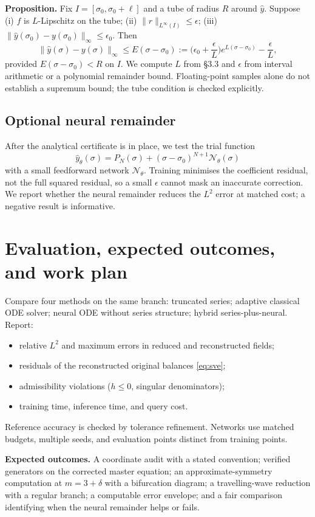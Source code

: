 \documentclass[12pt,a4paper]{article}
\begin{document}
\textbf{Proposition.} Fix $I=[\sigma_0,\sigma_0+\ell]$ and a tube of radius $R$ around $\hat y$. Suppose (i) $f$ is $L$-Lipschitz on the tube; (ii) $\|r\|_{L^\infty(I)}\le\epsilon$; (iii) $\|\hat y(\sigma_0)-y(\sigma_0)\|_\infty\le\epsilon_0$. Then
\[
\|\hat y(\sigma)-y(\sigma)\|_\infty\le E(\sigma-\sigma_0)
:=\Big(\epsilon_0+\frac{\epsilon}{L}\Big)e^{L(\sigma-\sigma_0)}-\frac{\epsilon}{L},
\]
provided $E(\sigma-\sigma_0)<R$ on $I$. We compute $L$ from \S3.3 and $\epsilon$ from interval arithmetic or a polynomial remainder bound. Floating-point samples alone do not establish a supremum bound; the tube condition is checked explicitly.

\subsection*{Optional neural remainder}
After the analytical certificate is in place, we test the trial function
\[
\hat y_\theta(\sigma)=P_N(\sigma)+(\sigma-\sigma_0)^{N+1}\mathcal N_\theta(\sigma)
\]
with a small feedforward network $\mathcal N_\theta$. Training minimises the coefficient residual, not the full squared residual, so a small $\epsilon$ cannot mask an inaccurate correction. We report whether the neural remainder reduces the $L^2$ error at matched cost; a negative result is informative.

\section{Evaluation, expected outcomes, and work plan}
Compare four methods on the same branch: truncated series; adaptive classical ODE solver; neural ODE without series structure; hybrid series-plus-neural. Report:
\begin{itemize}
\item relative $L^2$ and maximum errors in reduced and reconstructed fields;
\item residuals of the reconstructed original balances \eqref{eq:sve};
\item admissibility violations ($h\le 0$, singular denominators);
\item training time, inference time, and query cost.
\end{itemize}
Reference accuracy is checked by tolerance refinement. Networks use matched budgets, multiple seeds, and evaluation points distinct from training points.

\textbf{Expected outcomes.} A coordinate audit with a stated convention; verified generators on the corrected master equation; an approximate-symmetry computation at $m=3+\delta$ with a bifurcation diagram; a travelling-wave reduction with a regular branch; a computable error envelope; and a fair comparison identifying when the neural remainder helps or fails.
\end{document}
